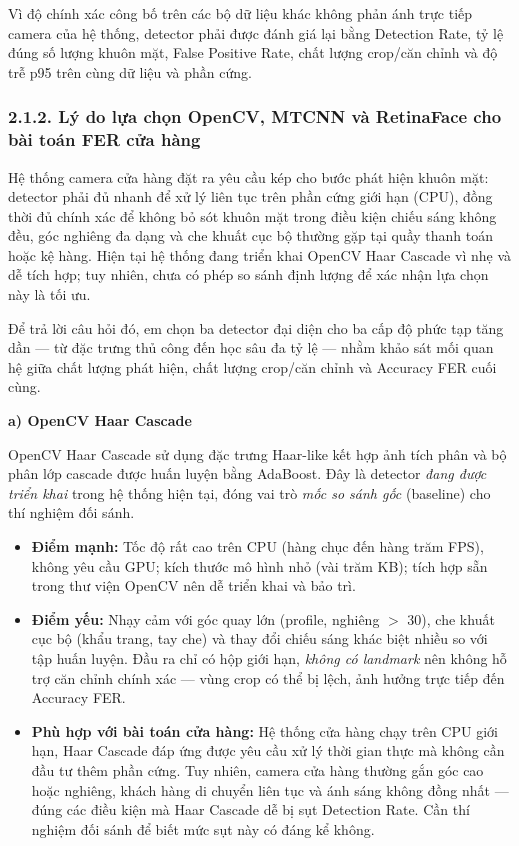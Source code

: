 Vì độ chính xác công bố trên các bộ dữ liệu khác không phản ánh trực tiếp camera của hệ thống, detector phải được đánh giá lại bằng Detection Rate, tỷ lệ đúng số lượng khuôn mặt, False Positive Rate, chất lượng crop/căn chỉnh và độ trễ p95 trên cùng dữ liệu và phần cứng.


\subsubsection*{2.1.2. Lý do lựa chọn OpenCV, MTCNN và RetinaFace cho bài toán FER cửa hàng}

Hệ thống camera cửa hàng đặt ra yêu cầu kép cho bước phát hiện khuôn mặt: detector phải đủ nhanh để xử lý liên tục trên phần cứng giới hạn (CPU), đồng thời đủ chính xác để không bỏ sót khuôn mặt trong điều kiện chiếu sáng không đều, góc nghiêng đa dạng và che khuất cục bộ thường gặp tại quầy thanh toán hoặc kệ hàng. Hiện tại hệ thống đang triển khai OpenCV Haar Cascade vì nhẹ và dễ tích hợp; tuy nhiên, chưa có phép so sánh định lượng để xác nhận lựa chọn này là tối ưu.

Để trả lời câu hỏi đó, em chọn ba detector đại diện cho ba cấp độ phức tạp tăng dần --- từ đặc trưng thủ công đến học sâu đa tỷ lệ --- nhằm khảo sát mối quan hệ giữa chất lượng phát hiện, chất lượng crop/căn chỉnh và Accuracy FER cuối cùng.

\vspace{0.3cm}
\noindent\textbf{a) OpenCV Haar Cascade}

OpenCV Haar Cascade \cite{viola2001rapid,opencv_cascade} sử dụng đặc trưng Haar-like kết hợp ảnh tích phân và bộ phân lớp cascade được huấn luyện bằng AdaBoost. Đây là detector \textit{đang được triển khai} trong hệ thống hiện tại, đóng vai trò \textit{mốc so sánh gốc} (baseline) cho thí nghiệm đối sánh.

\begin{itemize}
    \item \textbf{Điểm mạnh:} Tốc độ rất cao trên CPU (hàng chục đến hàng trăm FPS), không yêu cầu GPU; kích thước mô hình nhỏ (vài trăm KB); tích hợp sẵn trong thư viện OpenCV nên dễ triển khai và bảo trì.
    \item \textbf{Điểm yếu:} Nhạy cảm với góc quay lớn (profile, nghiêng $>$ 30\textdegree), che khuất cục bộ (khẩu trang, tay che) và thay đổi chiếu sáng khác biệt nhiều so với tập huấn luyện. Đầu ra chỉ có hộp giới hạn, \textit{không có landmark} nên không hỗ trợ căn chỉnh chính xác --- vùng crop có thể bị lệch, ảnh hưởng trực tiếp đến Accuracy FER.
    \item \textbf{Phù hợp với bài toán cửa hàng:} Hệ thống cửa hàng chạy trên CPU giới hạn, Haar Cascade đáp ứng được yêu cầu xử lý thời gian thực mà không cần đầu tư thêm phần cứng. Tuy nhiên, camera cửa hàng thường gắn góc cao hoặc nghiêng, khách hàng di chuyển liên tục và ánh sáng không đồng nhất --- đúng các điều kiện mà Haar Cascade dễ bị sụt Detection Rate. Cần thí nghiệm đối sánh để biết mức sụt này có đáng kể không.
\end{itemize}

